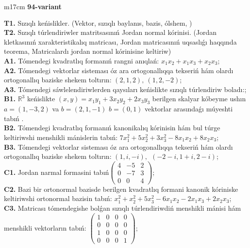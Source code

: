\documentclass{article}
\begin{document}
\begin{tabular}{m{17cm}}
\textbf{94-variant}
\newline

\textbf{T1.} Sızıqlı keńislikler.   (Vektor,  sızıqlı baylanıs, bazis, ólshem, )  \\
\textbf{T2.} Sızıqlı túrlendiriwler matritsasınıń Jordan normal kórinisi. (Jordan kletkasınıń xarakteristikalıq matricası, Jordan matricasınıń uqsaslıǵı haqqında teorema,  Matricalardı jordan normal kórinisine keltiriw) \\
\textbf{A1.} Tómendegi kvadratlıq formanıń rangni anıqlań: \(x_{1}x_{2} + x_{1}x_{3} + x_{2}x_{3}\); \\
\textbf{A2.} Tómendegi vektorlar sisteması óz ara ortogonallıqqa tekseriń hám olardı ortogonallıq baziske shekem toltırın: \((2,1,2),\ (1,2, - 2)\); \\
\textbf{A3.} Tómendegi sáwlelendiriwlerden qaysıları keńislikte sızıqlı túrlendiriw boladı:; \\
\textbf{B1.} \(\mathbb{R}^{3}\) keńislikte \((x,y) = x_{1}y_{1} + 3x_{2}y_{2} + 2x_{3}y_{3}\) berilgen skalyar kóbeyme ushın \(a = (1, - 3,2)\) va \(b = (2,1, - 1)\) \(b = (0,1)\) vektorlar arasındaǵı múyeshti tabıń . \\
\textbf{B2.} Tómendegi kvadratlıq formanıń kanonikalıq kórinisin hám bul túrge keltiriwshi menshikli mánislerin tabıń: \(7x_{1}^{2} + 5x_{2}^{2} + 3x_{3}^{2} - 8x_{1}x_{2} + 8x_{2}x_{3}\); \\
\textbf{B3.} Tómendegi vektorlar sisteması óz ara ortogonallıqqa tekseriń hám olardı ortogonallıq baziske shekem toltırın: \((1,i, - i),\ \ ( - 2 - i,1 + i,2 - i)\); \\
\textbf{C1.} Jordan narmal formasini tabıń\(\begin{pmatrix} 4 & - 5 & 2 \\ 0 & - 7 & 3 \\ 0 & 0 & 4 \end{pmatrix}\); \\
\textbf{C2.} Bazi bir ortonormal bazisde berilgen kvadratlıq formani kanonik kóriniske keltiriwshi ortonormal bazisin tabıń: \(x_{1}^{2} + x_{2}^{2} + 5x_{3}^{2} - 6x_{1}x_{2} - 2x_{1}x_{3} + 2x_{2}x_{3}\); \\
\textbf{C3.} Matricası tómendegishe bolǵan sızıqlı túrlendiriwdiń menshikli mánisi hám menshikli vektorların tabıń: \(\begin{pmatrix} 1 & 0 & 0 & 0 \\ 0 & 0 & 0 & 0 \\ 1 & 0 & 0 & 0 \\ 0 & 0 & 0 & 1 \end{pmatrix}\); \\

\end{tabular}
\vspace{1cm}
\end{document}
